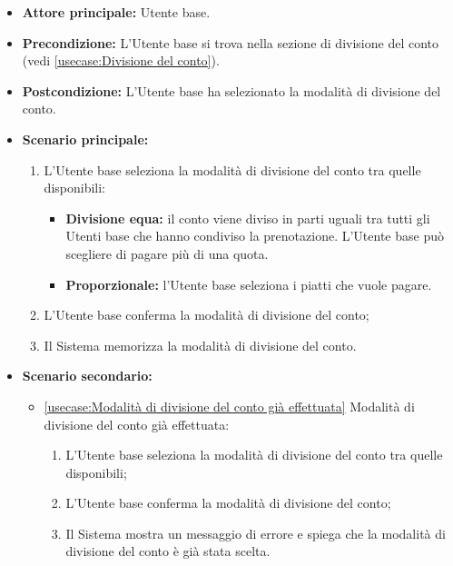 \label{usecase:Selezione della modalità di divisione del conto}
\begin{itemize}
	\item \textbf{Attore principale:} Utente base.
	
	\item \textbf{Precondizione:} L'Utente base si trova nella sezione di divisione del conto (vedi \autoref{usecase:Divisione del conto}).

	\item \textbf{Postcondizione:}
	      L'Utente base ha selezionato la modalità di divisione del conto.
	\item \textbf{Scenario principale:}
	      \begin{enumerate}
		      \item L'Utente base seleziona la modalità di divisione del conto
		            tra quelle disponibili:
					\begin{itemize}
						\item \textbf{Divisione equa:} il conto viene diviso in parti
							  uguali tra tutti gli Utenti base che hanno condiviso la
							  prenotazione. L'Utente base può scegliere di pagare più di
							  una quota.
		  
						\item \textbf{Proporzionale:} l'Utente base seleziona i piatti che vuole
							  pagare.
					\end{itemize}

		      \item L'Utente base conferma la modalità di divisione del conto;

		      \item Il Sistema memorizza la modalità di divisione del conto.
	      \end{enumerate}

	\item \textbf{Scenario secondario:}
		  \begin{itemize}
			  \item \autoref{usecase:Modalità di divisione del conto già effettuata} Modalità di divisione del conto già effettuata:
				\begin{enumerate}
					\item L'Utente base seleziona la modalità di divisione del conto
						tra quelle disponibili;
	
					\item L'Utente base conferma la modalità di divisione del conto;
	
					\item Il Sistema mostra un messaggio di errore e spiega che la
						modalità di divisione del conto è già stata scelta.
				\end{enumerate}
		  \end{itemize}

\end{itemize}


